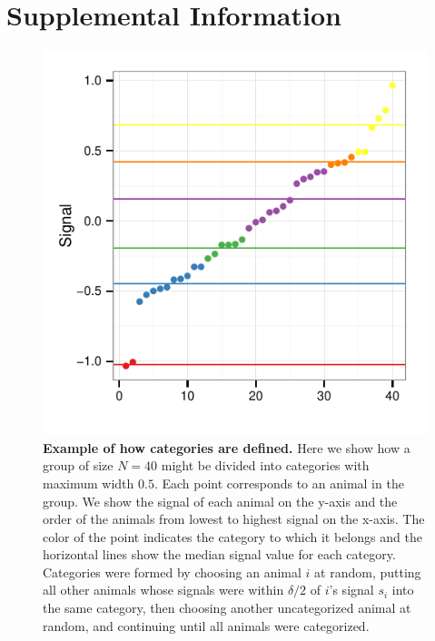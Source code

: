\section{Supplemental Information } 
\begin{figure}[h]
\includegraphics[width=.8\textwidth]{figures/categories.pdf}
\caption{\sffamily\small\textbf{Example of how categories are defined.}
Here we show how a group of size $N=40$ might be divided into categories with maximum width $0.5$. Each point corresponds to an animal in the group. We show the signal of each animal on the y-axis and the order of the animals from lowest to highest signal on the x-axis. The color of the point indicates the category to which it belongs and the horizontal lines show the median signal value for each category. Categories were formed by choosing an animal $i$ at random, putting all other animals whose signals were within $\delta/2$ of $i$'s signal $s_i$ into the same category, then choosing another uncategorized animal at random, and continuing until all animals were categorized.}
 \label{cats_ex}
\end{figure}

